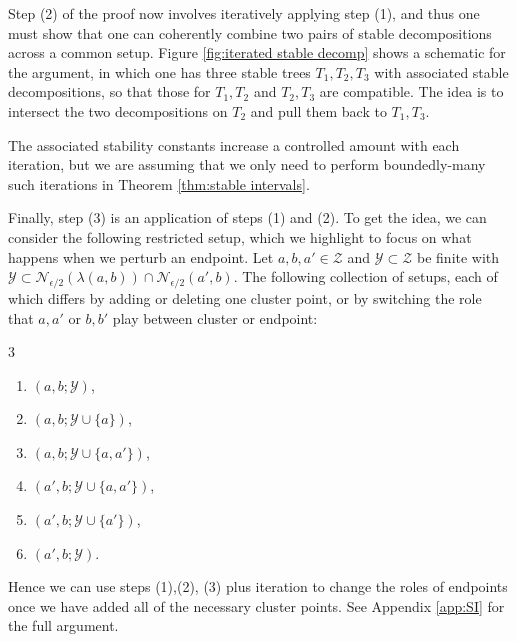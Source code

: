 \documentclass{amsart}
\theoremstyle{definition}
\theoremstyle{remark}
\theoremstyle{definition}
\newcommand{\calN}{\mathcal{N}}
\newcommand{\calY}{\mathcal{Y}}
\newcommand{\calZ}{\mathcal{Z}}
\begin{document}
Step (2) of the proof now involves iteratively applying step (1), and thus one must show that one can coherently combine two pairs of stable decompositions across a common setup.  Figure \ref{fig:iterated stable decomp} shows a schematic for the argument, in which one has three stable trees $T_1,T_2,T_3$ with associated stable decompositions, so that those for $T_1,T_2$ and $T_2,T_3$ are compatible.  The idea is to intersect the two decompositions on $T_2$ and pull them back to $T_1,T_3$.

The associated stability constants increase a controlled amount with each iteration, but we are assuming that we only need to perform boundedly-many such iterations in Theorem \ref{thm:stable intervals}.


\smallskip

Finally, step (3) is an application of steps (1) and (2).  To get the idea, we can consider the following restricted setup, which we highlight to focus on what happens when we perturb an endpoint.  Let $a,b,a' \in \calZ$ and $\calY \subset \calZ$ be finite with $\calY \subset \calN_{\epsilon/2}(\lambda(a,b)) \cap \calN_{\epsilon/2}(a',b)$.  The following collection of setups, each of which differs by adding or deleting one cluster point, or by switching the role that $a,a'$ or $b,b'$ play between cluster or endpoint:
\vspace{-.09in}
\begin{multicols}{3}
\begin{enumerate}
\item $(a,b;\calY)$,
\item $(a,b;\calY \cup \{a\})$,
\item $(a,b;\calY \cup \{a, a'\})$,
\item $(a',b;\calY \cup \{a,a'\})$,
\item $(a',b;\calY \cup \{a'\})$,
\item $(a',b;\calY)$.
\end{enumerate}
\end{multicols}

Hence we can use steps (1),(2), (3) plus iteration to change the roles of endpoints once we have added all of the necessary cluster points.  See Appendix \ref{app:SI} for the full argument.
\end{document}
